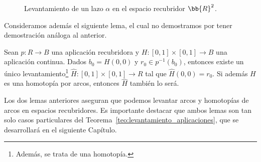\begin{observacion}
\begin{figure}[ht]
%
        \caption{Levantamiento de un lazo $\alpha$ en el espacio recubridor $\bb{R}^2$.}
        \label{fig:levantamiento_lazoR2}
    \end{figure}%

\end{observacion}

Consideramos además el siguiente lema, el cual no demostramos por tener demostración análoga al anterior.
\begin{lema}\label{lema:levantamiento_homotopias}
    Sean $p:R \to B$ una aplicación recubridora y $H:[0,1]\times[0,1]\to B$ una aplicación continua. Dados $b_0=H(0,0)$ y $r_0\in p^{-1}(b_0)$, entonces existe un único levantamiento\footnote{Además, se trata de una homotopía.} $\hat{H}:[0,1]\times[0,1]\to R$ tal que $\hat{H}(0,0) = r_0$. Si además $H$ es una homotopía por arcos, entonces $\hat{H}$ también lo será.
\end{lema}

Los dos lemas anteriores aseguran que podemos levantar arcos y homotopías de arcos en espacios recubridores. Es importante destacar que ambos lemas son tan solo casos particulares del Teorema~\ref{teo:levantamiento_aplicaciones}, que se desarrollará en el siguiente Capítulo.

